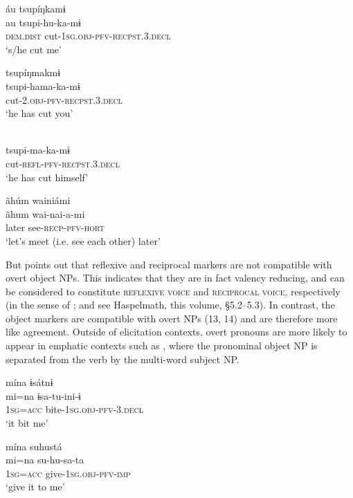 \documentclass[output=paper]{langscibook}
\begin{document}
\ea%
    \label{ex:overall:11}
\ea
    \glll áu tsupíŋkamɨ\\
    au  tsupi-hu-ka-mɨ\\
    \textsc{dem.dist}  cut\textsc{{}-1sg.obj-pfv-recpst.3.decl}\\
    \glt ‘s/he cut me’ \citep[247]{Overall2017}

\ex
\glll tsupíŋmakmɨ\\
    tsupi-hama-ka-mɨ\\
    cut\textsc{{}-2.obj-pfv-recpst.3.decl}\\
\glt    ‘he has cut you’ \citep[307]{Overall2017}

\ex
{}\\
    tsupi-ma-ka-mɨ\\
    cut\textsc{{}-refl-pfv-recpst.3.decl}\\
\glt    ‘he has cut himself’ \citep[307]{Overall2017}
\z
\z

\ea%
    \label{ex:overall:12}
    \glll ãhúm wainiámi\\
  ãhum  wai-nai-a-mi\\
  later  see-\textsc{recp-pfv-hort}\\
\glt ‘let’s meet (i.e. see each other) later’ \citep[424]{Overall2017}
\z

But \citet[306]{Overall2017} points out that
reflexive and reciprocal markers are not compatible with overt object NPs. This indicates that they are in fact valency reducing, and can be considered to constitute
\textsc{reflexive} \textsc{voice} and \textsc{reciprocal} \textsc{voice}, respectively (in the sense of \citealt{Kulikov2011}; and see Haspelmath, this volume, §5.2--5.3). In contrast, the object markers are compatible with overt NPs (13, 14) and are therefore more like agreement. Outside of elicitation contexts, overt pronouns are more likely to appear in emphatic contexts such as , where the pronominal object NP is separated from the verb by the multi-word subject NP.

\ea%
    \label{ex:overall:13}
    \glll mína ɨsátnɨ\\
  mi=na  ɨsa-tu-ini-ɨ\\
  1\textsc{sg=acc}  bite\textsc{{}-1sg.obj-pfv-3.decl}\\
  \glt  ‘it bit me’ \citep[293]{Overall2017}
\z

\ea%
    \label{ex:overall:14}
    \glll mína suhustá\\
  mi=na  su-hu-sa-ta\\
  1\textsc{sg=acc}  give\textsc{{}-1sg.obj-pfv-imp}\\
  \glt  ‘give it to me’ \citep[243]{Overall2017}
  \z
\end{document}
